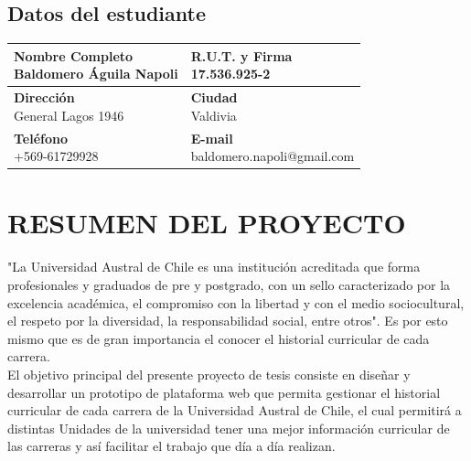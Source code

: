 \documentclass[12pt]{article}
\begin{document}
		\subsection{Datos del estudiante}
		\begin{large}
			\begin{tabular}{|l|l|}
				\hline
				
			{ \parbox[t]{7cm}{ {\bf Nombre Completo} \\Baldomero Águila Napoli}}& { \parbox[t]{7cm}{ {\bf R.U.T. y Firma} \\	17.536.925-2}}\\ 
				\hline
				{ \parbox[t]{8cm}{ {\bf Dirección} \\	General Lagos 1946}} & { \parbox[t]{8cm}{ {\bf Ciudad} \\	Valdivia}}\\ 

							
				\hline
				
				{ \parbox[t]{8cm}{ {\bf Teléfono} \\ +569-61729928}} & { \parbox[t]{8cm}{ {\bf E-mail} \\ baldomero.napoli@gmail.com}}
		\\ 
		
				\hline

			\end{tabular}
		\end{large}
		\newpage
	\section{RESUMEN DEL PROYECTO}
		
			"La Universidad Austral de Chile es una institución acreditada que forma profesionales y graduados de pre y postgrado, con un sello caracterizado por la excelencia académica, el compromiso con la libertad y con el medio sociocultural, el respeto por la diversidad, la responsabilidad social, entre otros"\cite{MOD07}. Es por esto mismo que es de gran importancia el conocer el historial curricular de cada carrera.
			\\
			
			El objetivo principal del presente proyecto de tesis consiste en diseñar y desarrollar un prototipo de plataforma web que permita gestionar el historial curricular de cada carrera de la Universidad Austral de Chile, el cual permitirá a distintas Unidades de la universidad tener una mejor información curricular de las carreras y así facilitar el trabajo que día a día realizan.
			\\
\end{document}
